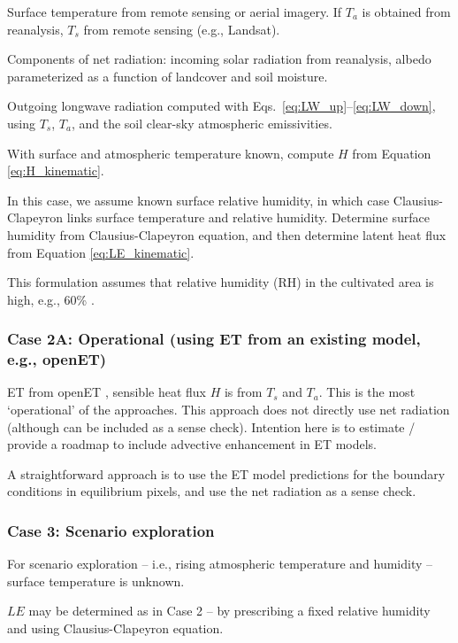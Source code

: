 \documentclass{article}
\begin{document}
    Surface temperature from remote sensing or aerial imagery. 
    If $T_a$ is obtained from reanalysis, $T_s$ from remote sensing (e.g., Landsat).

    Components of net radiation: 
    incoming solar radiation from reanalysis,   albedo parameterized as a function of landcover and soil moisture. 

    Outgoing longwave radiation computed  with Eqs.~\ref{eq:LW_up}–\ref{eq:LW_down}, using $T_s$, $T_a$, and the soil clear-sky atmospheric emissivities.

    With surface and atmospheric temperature known, compute $H$ from  Equation \ref{eq:H_kinematic}.

     In this case, we assume known surface relative humidity, in which case Clausius-Clapeyron links surface temperature and relative humidity.  
    Determine surface humidity from Clausius-Clapeyron equation, 
    and then determine latent heat flux from Equation \ref{eq:LE_kinematic}.

    This formulation assumes that relative humidity (RH) in the cultivated area is high, e.g., 60\% \cite{rao1974local}. 

    \subsubsection*{Case 2A: Operational (using ET from an existing model, e.g., openET)}

     ET from openET \cite{melton_openet_nodate}, 
     sensible heat flux $H$ is from $T_s$ and $T_a$.
     This is the most `operational' of the approaches. 
     This approach does not directly use net radiation (although can be included as a sense check). 
     Intention here is to estimate / provide a roadmap to include advective enhancement in ET models. 

    A straightforward approach is to use the ET model predictions for the boundary conditions in equilibrium pixels, and use the net radiation as a sense check.

    \subsubsection*{Case 3: Scenario exploration}

    For scenario exploration -- i.e., rising atmospheric temperature and humidity –  surface temperature is unknown.  

    $LE$ may be determined as in Case 2 -- by prescribing a fixed relative humidity and using Clausius-Clapeyron equation. 
\end{document}
